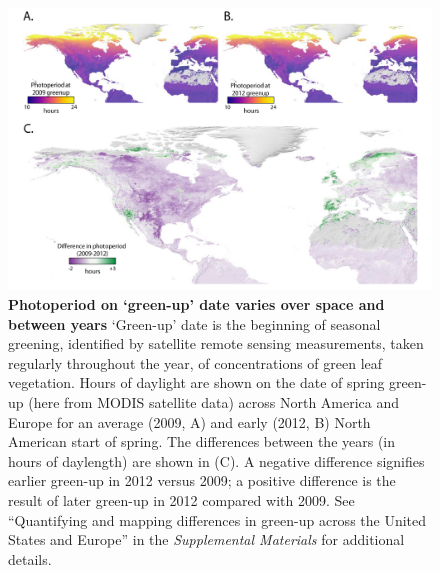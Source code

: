 \documentclass{article}
\begin{document}
 \begin{figure}[h]
\centering
\includegraphics{..//..//docs/photoperiod/figures/Greenup_corr_sm_leg.pdf} %
\caption{\textbf{Photoperiod on `green-up' date varies over space and between years} `Green-up' date is the beginning of seasonal greening, identified by satellite remote sensing measurements, taken regularly throughout the year, of concentrations of green leaf vegetation. Hours of daylight are shown on the date of spring green-up (here from MODIS satellite data) across North America and Europe for an average (2009, A) and early (2012, B) North American start of spring. The differences between the years (in hours of daylength) are shown in (C). A negative difference signifies earlier green-up in 2012 versus 2009; a positive difference is the result of later green-up in 2012 compared with 2009. See ``Quantifying and mapping differences in green-up across the United States and Europe'' in the \emph{Supplemental Materials} for additional details. }%
 \label{fig:greenup}%
 \end{figure}
\end{document}
